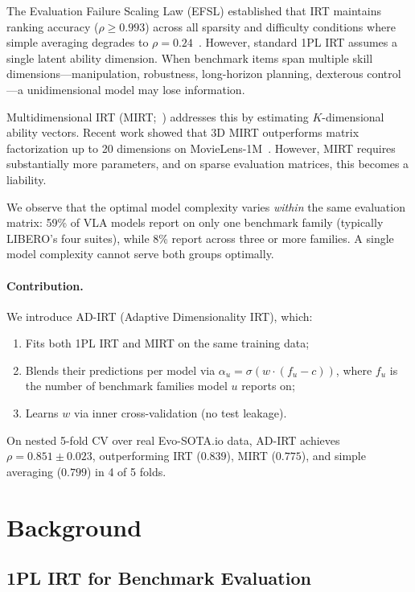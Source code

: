 \documentclass[11pt]{article}
\begin{document}
The Evaluation Failure Scaling Law (EFSL) established that IRT maintains ranking accuracy ($\rho \geq 0.993$) across all sparsity and difficulty conditions where simple averaging degrades to $\rho = 0.24$~\citep{kang2026efsl}. However, standard 1PL IRT assumes a single latent ability dimension. When benchmark items span multiple skill dimensions---manipulation, robustness, long-horizon planning, dexterous control---a unidimensional model may lose information.

Multidimensional IRT (MIRT;~\citealt{reckase2009}) addresses this by estimating $K$-dimensional ability vectors. Recent work showed that 3D MIRT outperforms matrix factorization up to 20 dimensions on MovieLens-1M~\citep{veldkamp2025}. However, MIRT requires substantially more parameters, and on sparse evaluation matrices, this becomes a liability.

We observe that the optimal model complexity varies \emph{within} the same evaluation matrix: 59\% of VLA models report on only one benchmark family (typically LIBERO's four suites), while 8\% report across three or more families. A single model complexity cannot serve both groups optimally.

\paragraph{Contribution.} We introduce AD-IRT (Adaptive Dimensionality IRT), which:
\begin{enumerate}
    \item Fits both 1PL IRT and MIRT on the same training data;
    \item Blends their predictions per model via $\alpha_u = \sigma(w \cdot (f_u - c))$, where $f_u$ is the number of benchmark families model $u$ reports on;
    \item Learns $w$ via inner cross-validation (no test leakage).
\end{enumerate}

On nested 5-fold CV over real Evo-SOTA.io data, AD-IRT achieves $\rho = 0.851 \pm 0.023$, outperforming IRT ($0.839$), MIRT ($0.775$), and simple averaging ($0.799$) in 4 of 5 folds.

\section{Background}

\subsection{1PL IRT for Benchmark Evaluation}
\end{document}

